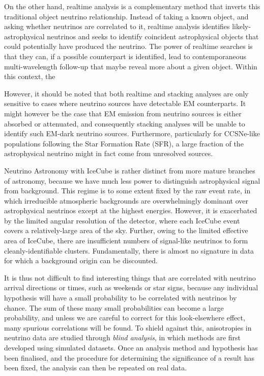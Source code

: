 On the other hand, realtime analysis is a complementary method that inverts this traditional object neutrino relationship. Instead of taking a known object, and asking whether neutrinos are correlated to it, realtime analysis identifies likely-astrophysical neutrinos and seeks to identify coincident astrophysical objects that could potentially have produced the neutrino. The power of realtime searches is that they can, if a possible counterpart is identified, lead to contemporaneous multi-wavelength follow-up that maybe reveal more about a given object. Within this context, the 

However, it should be noted that both realtime and stacking analyses are only sensitive to cases where neutrino sources have detectable EM counterparts. It might however be the case that EM emission from neutrino sources is either absorbed or attenuated, and consequently stacking analyses will be unable to identify such EM-dark neutrino sources. Furthermore, particularly for CCSNe-like populations following the Star Formation Rate (SFR), a large fraction of the astrophysical neutrino might in fact come from unresolved sources.

Neutrino Astronomy with IceCube is rather distinct from more mature branches of astronomy, because we have much less power to distinguish astrophysical signal from background. This regime is to some extent fixed by the raw event rate, in which irreducible atmospheric backgrounds are overwhelmingly dominant over astrophysical neutrinos except at the highest energies. However, it is exacerbated by the limited angular resolution of the detector, where each IceCube event covers a relatively-large area of the sky. Further, owing to the limited effective area of IceCube, there are insufficient numbers of signal-like neutrinos to form cleanly-identifiable clusters. Fundamentally, there is almost no signature in data for which a background origin can be discounted.

It is thus not difficult to find interesting things that are correlated with neutrino arrival directions or times, such as weekends or star signs, because any individual hypothesis will have a small probability to be correlated with  neutrinos by chance. The sum of these many small probabilities can become a large probability, and unless we are careful to correct for this look-elsewhere effect, many spurious correlations will be found. To shield against this, anisotropies in neutrino data are studied through \emph{blind analysis}, in which methods are first developed using simulated datasets. Once an analysis method and hypothesis has been finalised, and the procedure for determining the significance of a result has been fixed, the analysis can then be repeated on real data.